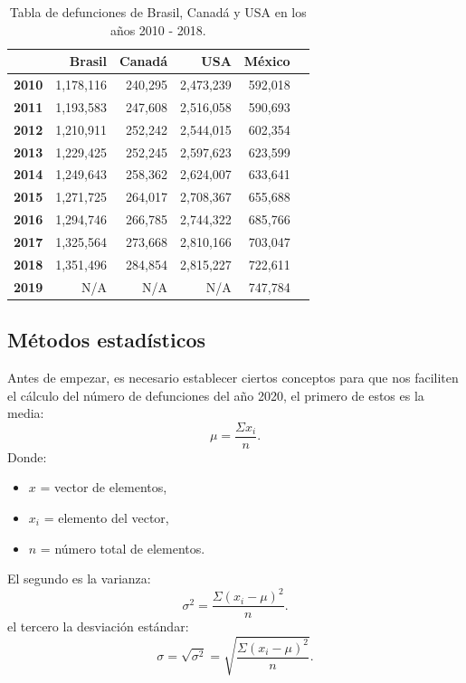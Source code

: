 \documentclass[12pt]{article}
\begin{document}
\begin{table}[H]
\begin{center}
\caption{Tabla de defunciones de Brasil, Canadá y USA en los años 2010 - 2018.}
\begin{tabular}{c|rrrrr}
\multicolumn{1}{l}{} & \textbf{Brasil} & \textbf{Canadá} & \textbf{USA} & \textbf{México}\\
\hline
\textbf{2010}        & 1,178,116           & 240,295             & 2,473,239                  & 592,018\\
\textbf{2011}  & 1,193,583           & 247,608             & 2,516,058          &   590,693         \\
\textbf{2012}    & 1,210,911          & 252,242              & 2,544,015           &  602,354      \\
\textbf{2013}    & 1,229,425          & 252,245            & 2,597,623            &  623,599     \\
\textbf{2014}    & 1,249,643         & 258,362           & 2,624,007             &  633,641 \\
\textbf{2015}    & 1,271,725           & 264,017            & 2,708,367              & 655,688   \\
\textbf{2016}    & 1,294,746          & 266,785             & 2,744,322               & 685,766 \\
\textbf{2017}    & 1,325,564         & 273,668            & 2,810,166             &  703,047   \\
\textbf{2018}    & 1,351,496           & 284,854             & 2,815,227  &  722,611   \\
\textbf{2019}    & N/A           & N/A             & N/A  &  747,784   \\


\end{tabular}
\label{mortalidadBrasil}
\end{center}
\end{table}




\subsection{Métodos estadísticos}
Antes de empezar, es necesario establecer ciertos conceptos para que nos faciliten el cálculo del número de defunciones del año 2020,
el primero de estos es la media:
\[ \mu = \frac{\Sigma x_{i}}{n} .\]
Donde:
\begin{itemize}
	\item $x$ = vector de elementos,
	\item $x_{i}$ = elemento del vector,
	\item $n$ = número total de elementos.

\end{itemize}
El segundo es la varianza:
\[ \sigma^{2} = \frac{\Sigma (x_{i}-\mu)^{2}}{n} .\]
el tercero la desviación estándar:
\[ \sigma = \sqrt{\sigma^{2}} = \sqrt{\frac{\Sigma (x_{i}-\mu)^{2}}{n}}.\]
\end{document}
